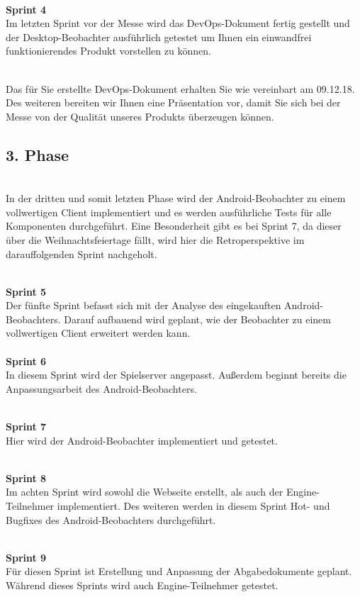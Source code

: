\documentclass[11pt, a4paper]{article} %
\begin{document}
\ \\\textbf{Sprint 4}
\ \\Im letzten Sprint vor der Messe wird das DevOps-Dokument fertig gestellt und der Desktop-Beobachter ausführlich getestet um Ihnen ein einwandfrei funktionierendes Produkt vorstellen zu können.


\ \\Das für Sie erstellte DevOps-Dokument erhalten Sie wie vereinbart am 09.12.18. Des weiteren bereiten wir Ihnen eine Präsentation vor, damit Sie sich bei der Messe von der Qualität unseres Produkts überzeugen können.\\


\subsection*{3. Phase}

\ \\In der dritten und somit letzten Phase wird der Android-Beobachter zu einem vollwertigen Client implementiert und es werden ausführliche Tests für alle Komponenten durchgeführt. Eine Besonderheit gibt es bei Sprint 7, da dieser über die Weihnachtsfeiertage fällt, wird hier die Retroperspektive im darauffolgenden Sprint nachgeholt.

\ \\\textbf{Sprint 5}
\ \\Der fünfte Sprint befasst sich mit der Analyse des eingekauften Android-Beobachters. Darauf aufbauend wird geplant, wie der Beobachter zu einem vollwertigen Client erweitert werden kann.\\

\ \\\textbf{Sprint 6}
\ \\In diesem Sprint wird der Spielserver angepasst. Außerdem beginnt bereits die Anpassungsarbeit des Android-Beobachters.

\ \\\textbf{Sprint 7}
\ \\Hier wird der Android-Beobachter implementiert und getestet.

\ \\\textbf{Sprint 8}
\ \\Im achten Sprint wird sowohl die Webseite erstellt, als auch der Engine-Teilnehmer implementiert. Des weiteren werden in diesem Sprint Hot- und Bugfixes des Android-Beobachters durchgeführt.

\ \\\textbf{Sprint 9}
\ \\Für diesen Sprint ist Erstellung und Anpassung der Abgabedokumente geplant. Während dieses Sprints wird auch Engine-Teilnehmer getestet.
\end{document}
